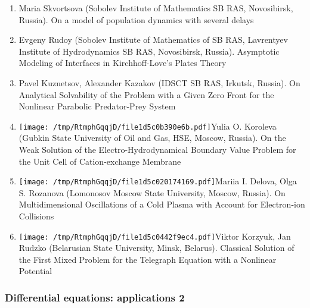 \documentclass[
]{article}
\providecommand{\tightlist}{%
  \setlength{\itemsep}{0pt}\setlength{\parskip}{0pt}}
\begin{document}
\begin{enumerate}
\def\labelenumi{\arabic{enumi}.}
\tightlist
\item
  Maria Skvortsova (Sobolev Institute of Mathematics SB RAS,
  Novosibirsk, Russia). On a model of population dynamics with several
  delays
\item
  Evgeny Rudoy (Sobolev Institute of Mathematics of SB RAS, Lavrentyev
  Institute of Hydrodynamics SB RAS, Novosibirsk, Russia). Asymptotic
  Modeling of Interfaces in Kirchhoff-Love's Plates Theory
\item
  Pavel Kuznetsov, Alexander Kazakov (IDSCT SB RAS, Irkutsk, Russia). On
  Analytical Solvability of the Problem with a Given Zero Front for the
  Nonlinear Parabolic Predator-Prey System
\item
  \protect\texttt{[image: /tmp/RtmphGqqjD/file1d5c0b390e6b.pdf]}Yulia
  O. Koroleva (Gubkin State University of Oil and Gas, HSE, Moscow,
  Russia). On the Weak Solution of the Electro-Hydrodynamical Boundary
  Value Problem for the Unit Cell of Cation-exchange Membrane
\item
  \protect\texttt{[image: /tmp/RtmphGqqjD/file1d5c020174169.pdf]}Mariia
  I. Delova, Olga S. Rozanova (Lomonosov Moscow State University,
  Moscow, Russia). On Multidimensional Oscillations of a Cold Plasma
  with Account for Electron-ion Collisions
\item
  \protect\texttt{[image: /tmp/RtmphGqqjD/file1d5c0442f9ec4.pdf]}Viktor
  Korzyuk, Jan Rudzko (Belarusian State University, Minsk, Belarus).
  Classical Solution of the First Mixed Problem for the Telegraph
  Equation with a Nonlinear Potential
\end{enumerate}

\hypertarget{dea2}{%
\subsubsection{Differential equations: applications 2}\label{dea2}}
\end{document}
